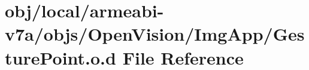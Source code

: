 \hypertarget{v7a_2objs_2_open_vision_2_img_app_2_gesture_point_8o_8d}{\section{obj/local/armeabi-\/v7a/objs/\-Open\-Vision/\-Img\-App/\-Gesture\-Point.o.\-d \-File \-Reference}
\label{v7a_2objs_2_open_vision_2_img_app_2_gesture_point_8o_8d}
}
